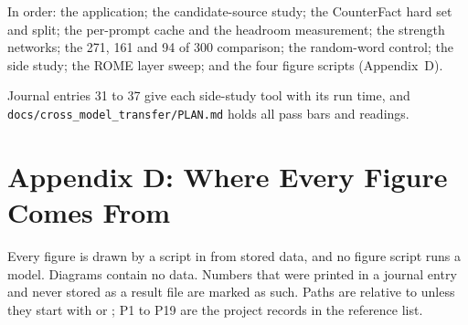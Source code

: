 In order: the application; the candidate-source study; the CounterFact hard set and split; the per-prompt cache and the headroom measurement; the strength networks; the 271, 161 and 94 of 300 comparison; the random-word control; the side study; the ROME layer sweep; and the four figure scripts (Appendix~D).

Journal entries 31 to 37 give each side-study tool with its run time, and \texttt{docs/\allowbreak cross\_\allowbreak model\_\allowbreak transfer/\allowbreak PLAN.md} holds all pass bars and readings.

\section*{Appendix D: Where Every Figure Comes From}

Every figure is drawn by a script in  from stored data, and no figure script runs a model. Diagrams contain no data. Numbers that were printed in a journal entry and never stored as a result file are marked as such. Paths are relative to  unless they start with  or ; P1 to P19 are the project records in the reference list.

